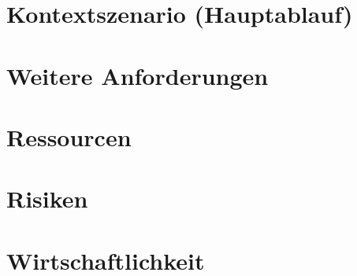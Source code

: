 \documentclass[10pt]{article}
\begin{document}
\section{Kontextszenario (Hauptablauf)}



\section{Weitere Anforderungen}

\section{Ressourcen}

\section{Risiken}

\section{Wirtschaftlichkeit}
\end{document}
